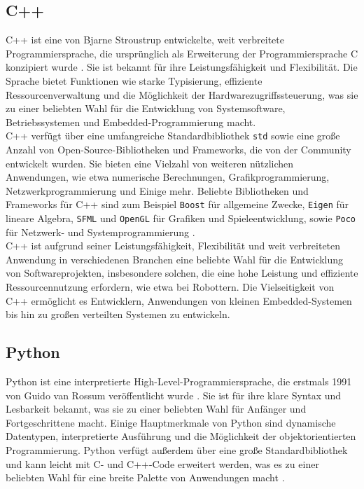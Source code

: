 \subsection{C++}\label{subsec:Cpp}
C++ ist eine von Bjarne Stroustrup entwickelte, weit verbreitete Programmiersprache, die ursprünglich als Erweiterung der Programmiersprache C konzipiert wurde \cite{CppWikipedia}. Sie ist bekannt für ihre Leistungsfähigkeit und Flexibilität. Die Sprache bietet Funktionen wie starke Typisierung, effiziente Ressourcenverwaltung und die Möglichkeit der Hardwarezugriffssteuerung, was sie zu einer beliebten Wahl für die Entwicklung von Systemsoftware, Betriebssystemen und Embedded-Programmierung macht.
\\

\noindent
C++ verfügt über eine umfangreiche Standardbibliothek \texttt{std} sowie eine große Anzahl von Open-Source-Bibliotheken und Frameworks, die von der Community entwickelt wurden. Sie bieten eine Vielzahl von weiteren nützlichen Anwendungen, wie etwa numerische Berechnungen, Grafikprogrammierung, Netzwerkprogrammierung und Einige mehr. Beliebte Bibliotheken und Frameworks für C++ sind zum Beispiel \texttt{Boost} für allgemeine Zwecke, \texttt{Eigen} für lineare Algebra, \texttt{\ac{SFML}} und \texttt{OpenGL} für Grafiken und Spieleentwicklung, sowie \texttt{Poco} für Netzwerk- und Systemprogrammierung \cite{CppBibliotheken}.\\
C++ ist aufgrund seiner Leistungsfähigkeit, Flexibilität und weit verbreiteten Anwendung in verschiedenen Branchen eine beliebte Wahl für die Entwicklung von Softwareprojekten, insbesondere solchen, die eine hohe Leistung und effiziente Ressourcennutzung erfordern, wie etwa bei Robottern. Die Vielseitigkeit von C++ ermöglicht es Entwicklern, Anwendungen von kleinen Embedded-Systemen bis hin zu großen verteilten Systemen zu entwickeln.\\

\subsection{Python}\label{subsec:Python}
Python ist eine interpretierte High-Level-Programmiersprache, die erstmals 1991 von Guido van Rossum veröffentlicht wurde \cite{wiki-python}. Sie ist für ihre klare Syntax und Lesbarkeit bekannt, was sie zu einer beliebten Wahl für Anfänger und Fortgeschrittene macht. Einige Hauptmerkmale von Python sind dynamische Datentypen, interpretierte Ausführung und die Möglichkeit der objektorientierten Programmierung. Python verfügt außerdem über eine große Standardbibliothek und kann leicht mit C- und C++-Code erweitert werden, was es zu einer beliebten Wahl für eine breite Palette von Anwendungen macht \cite{offical-python}.
\\

